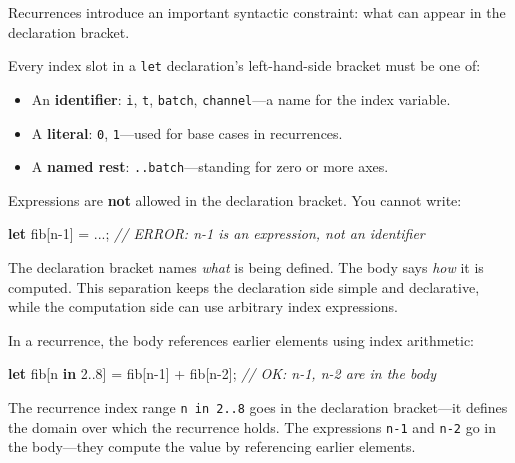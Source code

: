 \documentclass[11pt,]{article}
\newenvironment{Shaded}{}{}
\newcommand{\CommentTok}[1]{\textcolor[rgb]{0.38,0.63,0.69}{\textit{#1}}}
\newcommand{\DecValTok}[1]{\textcolor[rgb]{0.25,0.63,0.44}{#1}}
\newcommand{\KeywordTok}[1]{\textcolor[rgb]{0.00,0.44,0.13}{\textbf{#1}}}
\newcommand{\NormalTok}[1]{#1}
\newcommand{\OperatorTok}[1]{\textcolor[rgb]{0.40,0.40,0.40}{#1}}
\providecommand{\tightlist}{%
  \setlength{\itemsep}{0pt}\setlength{\parskip}{0pt}}
\begin{document}
Recurrences introduce an important syntactic constraint: what can appear
in the declaration bracket.

Every index slot in a \texttt{let} declaration's left-hand-side bracket
must be one of:

\begin{itemize}
\tightlist
\item
  An \textbf{identifier}: \texttt{i}, \texttt{t}, \texttt{batch},
  \texttt{channel}---a name for the index variable.
\item
  A \textbf{literal}: \texttt{0}, \texttt{1}---used for base cases in
  recurrences.
\item
  A \textbf{named rest}: \texttt{..batch}---standing for zero or more
  axes.
\end{itemize}

Expressions are \textbf{not} allowed in the declaration bracket. You
cannot write:

\begin{Shaded}
\begin{Highlighting}[]
\KeywordTok{let}\NormalTok{ fib}\OperatorTok{[}\NormalTok{n-}\DecValTok{1}\OperatorTok{]}\NormalTok{ = ...;   }\CommentTok{// ERROR: n-1 is an expression, not an identifier}
\end{Highlighting}
\end{Shaded}

The declaration bracket names \emph{what} is being defined. The body
says \emph{how} it is computed. This separation keeps the declaration
side simple and declarative, while the computation side can use
arbitrary index expressions.

In a recurrence, the body references earlier elements using index
arithmetic:

\begin{Shaded}
\begin{Highlighting}[]
\KeywordTok{let}\NormalTok{ fib}\OperatorTok{[}\NormalTok{n }\KeywordTok{in} \DecValTok{2.}\NormalTok{.}\DecValTok{8}\OperatorTok{]}\NormalTok{ = fib}\OperatorTok{[}\NormalTok{n-}\DecValTok{1}\OperatorTok{]}\NormalTok{ + fib}\OperatorTok{[}\NormalTok{n-}\DecValTok{2}\OperatorTok{]}\NormalTok{;   }\CommentTok{// OK: n-1, n-2 are in the body}
\end{Highlighting}
\end{Shaded}

The recurrence index range \texttt{n\ in\ 2..8} goes in the declaration
bracket---it defines the domain over which the recurrence holds. The
expressions \texttt{n-1} and \texttt{n-2} go in the body---they compute
the value by referencing earlier elements.
\end{document}
